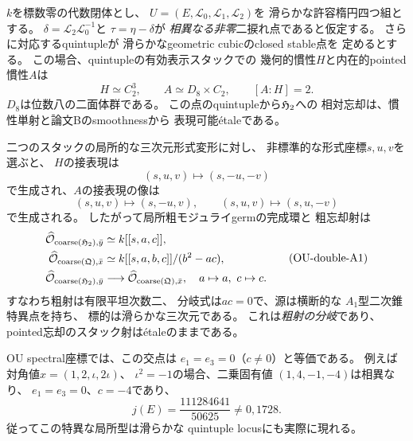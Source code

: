 \begin{theorem}
\label{thm:qa-ou-double-torsion-intersection-local-model}
$k$を標数零の代数閉体とし、
$U=(E,\mathcal L_0,\mathcal L_1,\mathcal L_2)$を
滑らかな許容楕円四つ組とする。
$\delta=\mathcal L_2\mathcal L_0^{-1}$と
$\tau=\eta-\delta$が
\emph{相異なる非零}二捩れ点であると仮定する。
さらに対応するquintupleが
滑らかなgeometric cubicのclosed stable点を
定めるとする。
この場合、quintupleの有効表示スタックでの
幾何的慣性$H$と内在的pointed慣性$A$は
\[
 H\simeq C_2^3,\qquad
 A\simeq D_8\times C_2,\qquad [A:H]=2.
 \tag{OU-double-I}\label{eq:qa-ou-double-torsion-inertia}
\]
$D_8$は位数八の二面体群である。
この点のquintupleから$\mathfrak H_2$への
相対忘却は、慣性単射と論文Bのsmoothnessから
表現可能étaleである。

二つのスタックの局所的な三次元形式変形に対し、
非標準的な形式座標$s,u,v$を選ぶと、
$H$の接表現は
\[
 (s,u,v)\longmapsto(s,-u,-v)
\]
で生成され、$A$の接表現の像は
\[
 (s,u,v)\longmapsto(s,-u,v),\qquad
 (s,u,v)\longmapsto(s,u,-v)
\]
で生成される。
したがって局所粗モジュライgermの完成環と
粗忘却射は
\[
 \begin{aligned}
 \widehat{\mathcal O}_{\mathrm{coarse}(\mathfrak H_2),\bar y}
   &\simeq k[[s,a,c]],\\
 \widehat{\mathcal O}_{\mathrm{coarse}(\mathfrak Q),\bar x}
   &\simeq k[[s,a,b,c]]/(b^2-ac),\\
 \widehat{\mathcal O}_{\mathrm{coarse}(\mathfrak H_2),\bar y}
   &\longrightarrow
     \widehat{\mathcal O}_{\mathrm{coarse}(\mathfrak Q),\bar x},
      \quad a\mapsto a,\ c\mapsto c .
 \end{aligned}
 \tag{OU-double-A1}\label{eq:qa-ou-double-torsion-a1-cover}
\]
すなわち粗射は有限平坦次数二、
分岐式は$ac=0$で、源は横断的な
$A_1$型二次錐特異点を持ち、
標的は滑らかな三次元である。
これは\emph{粗射の分岐}であり、
pointed忘却のスタック射はétaleのままである。

OU spectral座標では、この交点は
$e_1=e_3=0$（$c\ne0$）と等価である。
例えば対角値$x=(1,2,\iota,2\iota)$、
$\iota^2=-1$の場合、二乗固有値
$(1,4,-1,-4)$は相異なり、
$e_1=e_3=0$、$c=-4$であり、
\[
 j(E)=\frac{111284641}{50625}\ne0,1728.
\]
従ってこの特異な局所型は滑らかな
quintuple locusにも実際に現れる。
\end{theorem}
